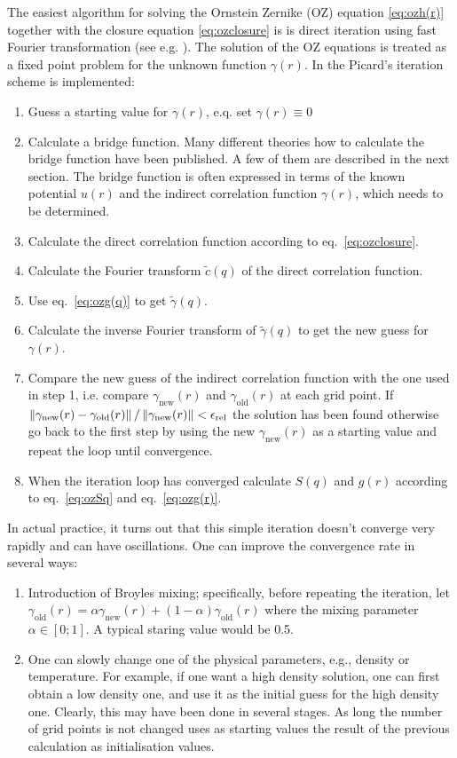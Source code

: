 The easiest algorithm for solving the Ornstein Zernike (OZ) equation \ref{eq:ozh(r)} together with the closure equation \ref{eq:ozclosure} is is direct iteration using fast Fourier transformation (see e.g. \cite{Homeier1995}). The solution of the OZ equations is treated as a fixed point problem for the unknown function $\gamma(r)$. In \SASfit the Picard's iteration scheme is implemented:
\begin{enumerate}
\item Guess a starting value for $\gamma(r)$, e.q. set $\gamma(r)\equiv 0$
\item Calculate a bridge function. Many different theories how to calculate the bridge function have been published. A few of them are described in the next section. The bridge function is often expressed in terms of the known potential $u(r)$ and the indirect correlation function $\gamma(r)$, which needs to be determined.
\item Calculate the direct correlation function according to eq.\ \ref{eq:ozclosure}.
\item Calculate the Fourier transform $\tilde{c}(q)$ of the direct correlation function.
\item Use eq.\ \ref{eq:ozg(q)} to get $\tilde{\gamma}(q)$.
\item Calculate the inverse Fourier transform of $\tilde{\gamma}(q)$ to get the new guess for $\gamma(r)$.
\item Compare the new guess of the indirect correlation function with the one used in step 1, i.e. compare $\gamma_\text{new}(r)$ and $\gamma_\text{old}(r)$ at each grid point. If $\Norm{\gamma_\text{new}(r)-\gamma_\text{old}(r)}/\Norm{\gamma_\text{new}(r)} < \epsilon_\text{rel}$ the solution has been found otherwise go back to the first step by using the new $\gamma_\text{new}(r)$ as a starting value and repeat the loop until convergence. \item When the iteration loop has converged calculate $S(q)$ and $g(r)$ according to eq.\ \ref{eq:ozSq} and eq.\ \ref{eq:ozg(r)}.
\end{enumerate}
In actual practice, it turns out that this simple iteration doesn’t converge very rapidly and can have oscillations. One can improve the convergence rate in several ways:
\begin{enumerate}
\item Introduction of  Broyles mixing; specifically, before repeating the iteration, let $\gamma_\text{old}(r) = \alpha \gamma_\text{new}(r) + (1 -\alpha)\gamma_\text{old}(r)$
where the mixing parameter $\alpha \in [0;1]$. A typical staring value would be 0.5.
\item One can slowly change one of the physical parameters, e.g., density or temperature. For example, if one want a high density solution, one can first obtain a low density one, and use it as the initial guess for the high density one. Clearly, this may have been done in several stages. As long the number of grid points is not changed \SASfit uses as starting values the result of the previous calculation as initialisation values.
\end{enumerate}

